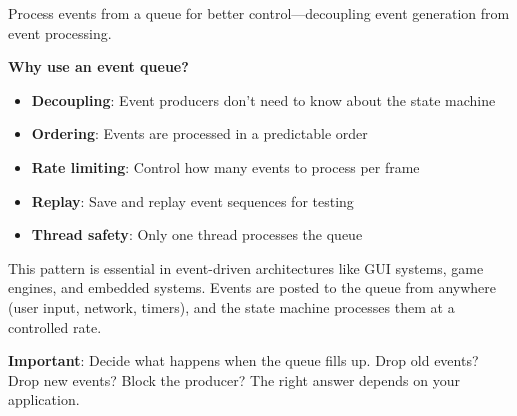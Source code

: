 Process events from a queue for better control---decoupling event generation from event processing.

\textbf{Why use an event queue?}

\begin{itemize}
    \item \textbf{Decoupling}: Event producers don't need to know about the state machine
    \item \textbf{Ordering}: Events are processed in a predictable order
    \item \textbf{Rate limiting}: Control how many events to process per frame
    \item \textbf{Replay}: Save and replay event sequences for testing
    \item \textbf{Thread safety}: Only one thread processes the queue
\end{itemize}

This pattern is essential in event-driven architectures like GUI systems, game engines, and embedded systems. Events are posted to the queue from anywhere (user input, network, timers), and the state machine processes them at a controlled rate.

\textbf{Important}: Decide what happens when the queue fills up. Drop old events? Drop new events? Block the producer? The right answer depends on your application.

